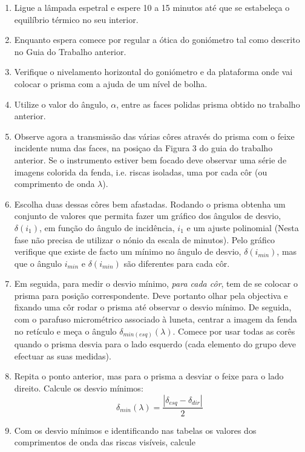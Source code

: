 \documentclass[a4paper,12pt]{article}  %
\begin{document}
\begin{enumerate}
\item Ligue  a  lâmpada  espetral  e  espere  10  a  15  minutos    até  que  se  estabeleça  o 
equilíbrio térmico no seu interior. 
\item Enquanto espera comece por regular a ótica  do goniómetro tal como descrito no Guia do Trabalho anterior.
\item Verifique o nivelamento horizontal do goniómetro e da plataforma onde vai colocar o prisma com a ajuda de um nível de bolha. 
\item Utilize o valor do ângulo, $\alpha$, entre as faces polidas prisma obtido no trabalho anterior.
\item  Observe agora  a  transmissão  das várias côres  através  do  prisma  com  o  feixe  incidente  numa  das  faces, na posiçao da Figura 3 do guia do trabalho anterior.  Se o instrumento estiver bem focado deve  observar   uma  série  de 
imagens colorida da fenda, i.e. riscas isoladas, uma por cada côr (ou comprimento de onda $\lambda$).
\item Escolha duas dessas côres bem afastadas. Rodando o prisma obtenha um conjunto de valores que permita fazer um gráfico dos ângulos de desvio, $\delta(i_1)$, 
em função do ângulo de incidência, $i_1$ e um ajuste polinomial (Nesta fase não precisa de utilizar o nónio da escala de minutos). Pelo gráfico verifique que existe de facto um mínimo no ângulo de desvio,  $ \delta(i_{min})$, mas  que o ângulo $i_{min}$ e $\delta(i_{min})$ são  diferentes para cada côr.
\item  Em seguida, para medir o desvio mínimo,  \emph{para cada côr}, tem de se colocar o prisma para posição correspondente. Deve portanto olhar pela objectiva e fixando uma côr rodar o prisma até observar o desvio mínimo.
De seguida,  com  o  parafuso micrométrico associado à luneta, centrar  a imagem  da fenda no retículo e meça o  ângulo  $\delta_{min(esq)}(\lambda)$. Comece por usar todas as corês quando o prisma desvia para o lado esquerdo (cada elemento do grupo deve efectuar as suas medidas). 
\item Repita o ponto anterior, mas para o prisma a desviar o feixe para o lado direito. Calcule os desvio mínimos:
$$\delta_{min}(\lambda) = \frac{|\delta_{esq} -  \delta_{dir}|}{2}$$ 
\item Com os desvio mínimos e identificando  nas tabelas os valores  dos  comprimentos  de onda das riscas visíveis, calcule  

\end{enumerate}
\end{document}

